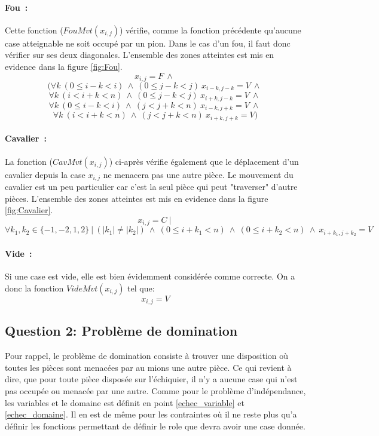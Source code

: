 \documentclass[a4paper,11pt]{article}
\newcommand{\AND}{~\wedge~}
\newcommand{\TQ}{~|~}
\begin{document}
          \paragraph{Fou~:} Cette fonction ($FouMvt(x_{i, j})$) vérifie, comme la fonction précédente qu'aucune case atteignable ne soit occupé par un pion.  Dans le cas d'un fou, il faut donc vérifier sur ses deux diagonales. L'ensemble des zones atteintes est mis en evidence dans la figure \ref{fig:Fou}.
            \[x_{i, j} = F \AND \]
            \[(\forall k~(0 \leq i-k < i) \AND (0 \leq j-k < j) ~ x_{i-k, j-k} = V \AND \]
            \[\forall k~(i < i+k < n) \AND (0 \leq j-k < j) ~ x_{i+k, j-k} = V \AND \]
            \[\forall k~(0 \leq i-k < i) \AND (j < j+k < n) ~ x_{i-k, j+k} = V \AND \]
            \[\forall k~(i < i+k < n) \AND (j < j+k < n) ~ x_{i+k, j+k} = V)\]

          \paragraph{Cavalier~:}
             La fonction ($CavMvt(x_{i, j})$) ci-après vérifie également que le déplacement d'un cavalier depuis la case $x_{i, j}$ ne menacera pas une autre pièce. Le mouvement du cavalier est un peu particulier car c'est la seul pièce qui peut "traverser" d'autre pièces. L'ensemble des zones atteintes est mis en evidence dans la figure \ref{fig:Cavalier}.
             \[x_{i, j} = C \TQ \]
             \[\forall k_{1}, k_{2} \in \{-1, -2, 1, 2\} \TQ (|k_{1}| \neq |k_{2}|) \AND (0 \leq i+k_{1} < n) \AND (0 \leq i+k_{2} < n) \AND x_{i+k_{1}, j+k_{2}} = V\]
             
         \paragraph{Vide~:}
            Si une case est vide, elle est bien évidemment considérée comme correcte.  On a donc la fonction $VideMvt(x_{i, j})$ tel que:
            \[x_{i,j} = V\]
    
    
    \subsection{Question 2: Problème de domination}
        Pour rappel, le problème de domination consiste à trouver une disposition où toutes les pièces sont menacées par au mions une autre pièce. Ce qui revient à dire, que pour toute pièce disposée sur l'échiquier, il n'y a aucune case qui n'est pas occupée ou menacée par une autre. Comme pour le problème d'indépendance, les variables et le domaine est définit en point \ref{echec_variable} et \ref{echec_domaine}. Il en est de même pour les contraintes où il ne reste plus qu'a définir les fonctions permettant de définir le role que devra avoir une case donnée.
            
\end{document}
